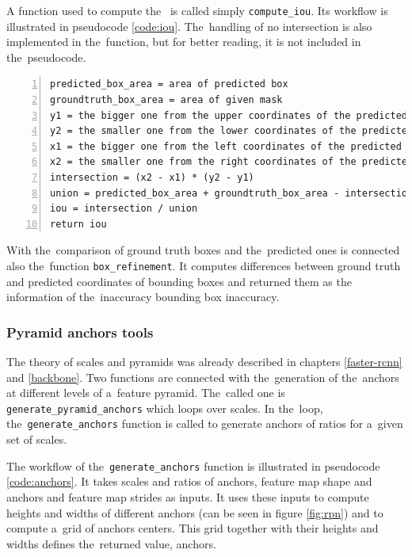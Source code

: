A function used to compute the~ is called simply \verb|compute_iou|. Its 
workflow is illustrated in pseudocode \ref{code:iou}. The~handling of no 
intersection is also implemented in the~function, but for better reading, it is 
not included in the~pseudocode.

{\scriptsize
\begin{lstlisting}[style=python, caption={compute\_iou}, captionpos=b, 
label=code:iou, deletekeywords={from, and},
backgroundcolor = \color{light-gray}, numbers=left, breaklines=true]
predicted_box_area = area of predicted box
groundtruth_box_area = area of given mask
y1 = the bigger one from the upper coordinates of the predicted and ground truth bboxes
y2 = the smaller one from the lower coordinates of the predicted and ground truth bboxes
x1 = the bigger one from the left coordinates of the predicted and ground truth bboxes
x2 = the smaller one from the right coordinates of the predicted and ground truth bboxes
intersection = (x2 - x1) * (y2 - y1)
union = predicted_box_area + groundtruth_box_area - intersection
iou = intersection / union
return iou
\end{lstlisting}}

With the~comparison of ground truth boxes and the~predicted ones is connected 
also the~function \verb|box_refinement|. It computes differences between ground 
truth and predicted coordinates of bounding boxes and returned them as the~
information of the~inaccuracy bounding box inaccuracy.


\subsubsection{Pyramid anchors tools}
\label{anchors-func}

The theory of scales and pyramids was already described in chapters 
\ref{faster-rcnn} and \ref{backbone}. Two functions are connected with
the~generation of the~anchors at different levels of a~feature pyramid. The~called 
one is \verb|generate_pyramid_anchors| which loops over scales. In the~loop,
the~\verb|generate_anchors| function is called to generate anchors of ratios for
a~given set of scales. 

The workflow of the~\verb|generate_anchors| function is illustrated in 
pseudocode \ref{code:anchors}. It takes scales and ratios of anchors, feature
map shape and anchors and feature map strides as inputs. It uses these inputs
to compute heights and widths of different anchors (can be seen in figure
\ref{fig:rpn}) and to compute a~grid of anchors centers. This grid together
with their heights and widths defines the~returned value, anchors.


